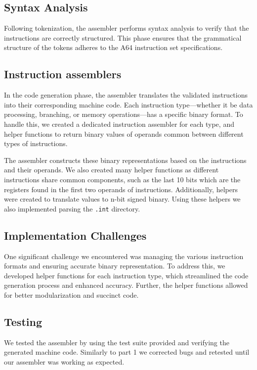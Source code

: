 \documentclass[9pt,a4paper,twoside]{tau-class/tau}
\begin{document}
    \subsection{Syntax Analysis}  
    Following tokenization, the assembler performs syntax analysis to verify that the instructions are correctly structured. This phase ensures that the grammatical structure of the tokens adheres to the A64 instruction set specifications. 

    \subsection{Instruction assemblers}
    In the code generation phase, the assembler translates the validated instructions into their corresponding machine code. Each instruction type—whether it be data processing, branching, or memory operations—has a specific binary format. To handle this, we created a dedicated instruction assembler for each type, and helper functions to return binary values of operands common between different types of instructions. 
    
    The assembler constructs these binary representations based on the instructions and their operands. We also created many helper functions as different instructions share common components, such as the last 10 bits which are the registers found in the first two operands of instructions. Additionally, helpers were created to translate values to n-bit signed binary. Using these helpers we also implemented parsing the  \texttt{.int} directory.       
    
    \subsection{Implementation Challenges}   
    One significant challenge we encountered was managing the various instruction formats and ensuring accurate binary representation. To address this, we developed helper functions for each instruction type, which streamlined the code generation process and enhanced accuracy. Further, the helper functions allowed for better modularization and succinct code.  

    \subsection{Testing}
    We tested the assembler by using the test suite provided and verifying the generated machine code. Similarly to part 1 we corrected bugs and retested until our assembler was working as expected.
\end{document}
